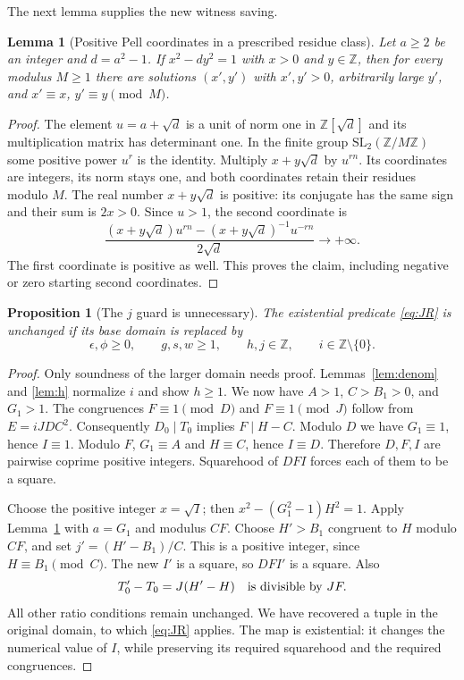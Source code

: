 \documentclass[11pt]{article}
\newtheorem{lemma}[theorem]{Lemma}
\newtheorem{proposition}[theorem]{Proposition}
\theoremstyle{remark}\newtheorem{remark}[theorem]{Remark}
\newcommand{\Z}{\mathbb Z}\newcommand{\N}{\mathbb N}
\begin{document}
The next lemma supplies the new witness saving.
\begin{lemma}[Positive Pell coordinates in a prescribed residue class]\label{lem:pellpositive}
Let $a\ge2$ be an integer and $d=a^2-1$. If
$x^2-dy^2=1$ with $x>0$ and $y\in\Z$, then for every modulus $M\ge1$
there are solutions $(x',y')$ with $x',y'>0$, arbitrarily large $y'$, and
$x'\equiv x$, $y'\equiv y\pmod M$.
\end{lemma}
\begin{proof}
The element $u=a+\sqrt d$ is a unit of norm one in $\Z[\sqrt d]$ and
its multiplication matrix has determinant one. In the finite group
$\mathrm{SL}_2(\Z/M\Z)$ some positive power $u^r$ is the identity.
Multiply $x+y\sqrt d$ by $u^{rn}$. Its coordinates are integers, its norm
stays one, and both coordinates retain their residues modulo $M$.
The real number $x+y\sqrt d$ is positive: its conjugate has the same
sign and their sum is $2x>0$. Since $u>1$, the second coordinate is
\[
 \frac{(x+y\sqrt d)u^{rn}-(x+y\sqrt d)^{-1}u^{-rn}}{2\sqrt d}
 \longrightarrow+\infty.
\]
The first coordinate is positive as well. This proves the claim, including
negative or zero starting second coordinates.
\end{proof}

\begin{proposition}[The $j$ guard is unnecessary]\label{prop:j}
The existential predicate \eqref{eq:JR} is unchanged if its base domain is
replaced by
\[
 \epsilon,\phi\ge0,\qquad g,s,w\ge1,\qquad
 h,j\in\Z,\qquad i\in\Z\setminus\{0\}.
\]
\end{proposition}
\begin{proof}
Only soundness of the larger domain needs proof. Lemmas~\ref{lem:denom}
and \ref{lem:h} normalize $i$ and show $h\ge1$. We now have
$A>1$, $C>B_1>0$, and $G_1>1$.
The congruences $F\equiv1\pmod D$ and $F\equiv1\pmod J$ follow
from $E=iJDC^2$. Consequently $D_0\mid T_0$ implies
$F\mid H-C$. Modulo $D$ we have $G_1\equiv1$, hence $I\equiv1$.
Modulo $F$, $G_1\equiv A$ and $H\equiv C$, hence $I\equiv D$.
Therefore $D,F,I$ are pairwise coprime positive integers. Squarehood of
$DFI$ forces each of them to be a square.

Choose the positive integer $x=\sqrt I$; then
$x^2-(G_1^2-1)H^2=1$. Apply Lemma~\ref{lem:pellpositive} with
$a=G_1$ and modulus $CF$. Choose $H'>B_1$ congruent to $H$ modulo $CF$,
and set $j'=(H'-B_1)/C$. This is a positive integer, since
$H\equiv B_1\pmod C$. The new $I'$ is a square, so $DFI'$ is a square.
Also
\[
 T_0'-T_0=J(H'-H)\quad\hbox{is divisible by }JF.
\]
All other ratio conditions remain unchanged. We have recovered a tuple in
the original domain, to which \eqref{eq:JR} applies. The map is existential:
it changes the numerical value of $I$, while preserving its required
squarehood and the required congruences.
\end{proof}
\end{document}
